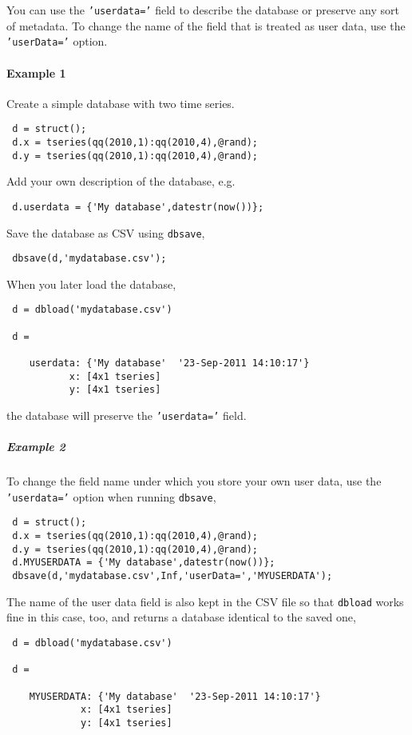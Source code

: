  You can use the \texttt{'userdata='} field to describe the database or
 preserve any sort of metadata. To change the name of the field that is
 treated as user data, use the \texttt{'userData='} option.
 
 \paragraph{Example 1}
 
 Create a simple database with two time series.
 
 \begin{verbatim}
 d = struct();
 d.x = tseries(qq(2010,1):qq(2010,4),@rand);
 d.y = tseries(qq(2010,1):qq(2010,4),@rand);
 \end{verbatim}
 
 Add your own description of the database, e.g.
 
 \begin{verbatim}
 d.userdata = {'My database',datestr(now())};
 \end{verbatim}
 
 Save the database as CSV using \texttt{dbsave},
 
 \begin{verbatim}
 dbsave(d,'mydatabase.csv');
 \end{verbatim}
 
 When you later load the database,
 
 \begin{verbatim}
 d = dbload('mydatabase.csv')
 
 d = 
 
    userdata: {'My database'  '23-Sep-2011 14:10:17'}
           x: [4x1 tseries]
           y: [4x1 tseries]
 \end{verbatim}
 
 the database will preserve the \texttt{'userdata='} field.
 
 \subparagraph{Example 2}
 
 To change the field name under which you store your own user data, use
 the \texttt{'userdata='} option when running \texttt{dbsave},
 
 \begin{verbatim}
 d = struct();
 d.x = tseries(qq(2010,1):qq(2010,4),@rand);
 d.y = tseries(qq(2010,1):qq(2010,4),@rand);
 d.MYUSERDATA = {'My database',datestr(now())};
 dbsave(d,'mydatabase.csv',Inf,'userData=','MYUSERDATA');
 \end{verbatim}
 
 The name of the user data field is also kept in the CSV file so that
 \texttt{dbload} works fine in this case, too, and returns a database
 identical to the saved one,
 
 \begin{verbatim}
 d = dbload('mydatabase.csv')
 
 d = 
 
    MYUSERDATA: {'My database'  '23-Sep-2011 14:10:17'}
             x: [4x1 tseries]
             y: [4x1 tseries]
 \end{verbatim}


